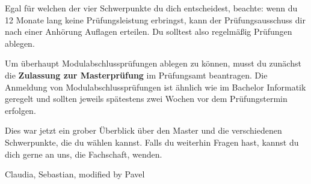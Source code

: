 Egal für welchen der vier Schwerpunkte du dich entscheidest, beachte: wenn du 12 Monate lang keine Prüfungsleistung erbringst, kann der Prüfungsausschuss dir nach einer Anhörung Auflagen erteilen. Du solltest also regelmäßig Prüfungen ablegen.

Um überhaupt Modulabschlussprüfungen ablegen zu können, musst du zunächst die \textbf{Zulassung zur Masterprüfung} im Prüfungsamt beantragen. Die Anmeldung von Modulabschlussprüfungen ist ähnlich wie im Bachelor Informatik geregelt und sollten jeweils spätestens zwei Wochen vor dem Prüfungstermin erfolgen.

Dies war jetzt ein grober Überblick über den Master und die verschiedenen Schwerpunkte, die du wählen kannst. Falls du weiterhin Fragen hast, kannst du dich gerne an uns, die Fachschaft, wenden.

\begin{flushright} Claudia, Sebastian, modified by Pavel \end{flushright}
